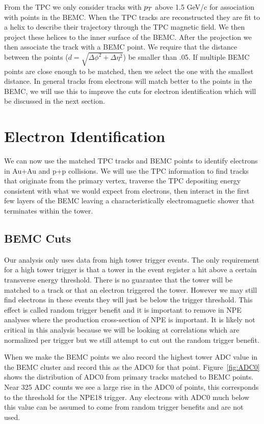 From the TPC we only consider tracks with $p_{T}$ above 1.5 GeV/c for association with points in the BEMC. When the TPC tracks are reconstructed they are fit to a helix to describe their trajectory through the TPC magnetic field. We then project these helices to the inner surface of the BEMC. After the projection we then associate the track with a BEMC point. We require that the distance between the points ($d = \sqrt{\Delta\phi^2 + \Delta\eta^2}$) be smaller than .05. If multiple BEMC points are close enough to be matched, then we select the one with the smallest distance. In general tracks from electrons will match better to the points in the BEMC, we will use this to improve the cuts for electron identification which will be discussed in the next section.

\section{Electron Identification}

We can now use the matched TPC tracks and BEMC points to identify electrons in Au+Au and p+p collisions. We will use the TPC information to find tracks that originate from the primary vertex, traverse the TPC depositing energy consistent with what we would expect from electrons, then interact in the first few layers of the BEMC leaving a characteristically electromagnetic shower that terminates within the tower.

\subsection{BEMC Cuts}

Our analysis only uses data from high tower trigger events. The only requirement for a high tower trigger is that a tower in the event register a hit above a certain transverse energy threshold. There is no guarantee that the tower will be matched to a track or that an electron triggered the tower. However we may still find electrons in these events they will just be below the trigger threshold. This effect is called random trigger benefit and it is important to remove in NPE analyses where the production cross-section of NPE is important. It is likely not critical in this analysis because we will be looking at correlations which are normalized per trigger but we still attempt to cut out the random trigger benefit. 

When we make the BEMC points we also record the highest tower ADC value in the BEMC cluster and record this as the ADC0 for that point. Figure~\ref{fig:ADC0} shows the distribution of ADC0 from primary tracks matched to BEMC points. Near 325 ADC counts we see a large rise in the ADC0 of points, this corresponds to the threshold for the NPE18 trigger. Any electrons with ADC0 much below this value can be assumed to come from random trigger benefits and are not used. 


